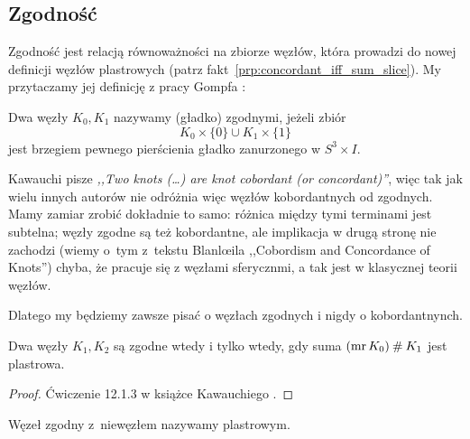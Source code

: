 
\subsection{Zgodność}
Zgodność jest relacją równoważności na zbiorze węzłów, która prowadzi do nowej definicji węzłów plastrowych (patrz fakt~\ref{prp:concordant_iff_sum_slice}).
My przytaczamy jej definicję z pracy Gompfa \cite{gompf1986}:

\begin{definition}[zgodność]
%
    Dwa węzły $K_0, K_1$ nazywamy (gładko) zgodnymi, jeżeli zbiór
    \begin{equation}
        K_0 \times \{0\} \cup K_1 \times \{1\}
    \end{equation}
    jest brzegiem pewnego pierścienia gładko zanurzonego w $S^3 \times I$.
\end{definition}

Kawauchi \cite[s. 156]{kawauchi1996} pisze \emph{,,Two knots (…) are knot cobordant (or concordant)''}, więc tak jak wielu innych autorów nie odróżnia więc węzłów kobordantnych od zgodnych.
Mamy zamiar zrobić dokładnie to samo: różnica między tymi terminami jest subtelna; węzły zgodne są też kobordantne, ale implikacja w drugą stronę nie zachodzi (wiemy o~tym z~tekstu Blanlœila ,,Cobordism and Concordance of Knots'') chyba, że pracuje się z węzłami sferycznmi, a tak jest w klasycznej teorii węzłów.
%

Dlatego my będziemy zawsze pisać o węzłach zgodnych i nigdy o kobordantnynch.

\begin{proposition}
\label{prp:concordant_iff_sum_slice}%
    Dwa węzły $K_1, K_2$ są zgodne wtedy i tylko wtedy, gdy suma $(\operatorname{mr} K_0) \mathbin{\#} K_1$ jest plastrowa.
\end{proposition}

\begin{proof}
    Ćwiczenie 12.1.3 w książce Kawauchiego \cite{kawauchi1996}.
\end{proof}

\begin{definition}
    Węzeł zgodny z~niewęzłem nazywamy plastrowym.
\end{definition}


